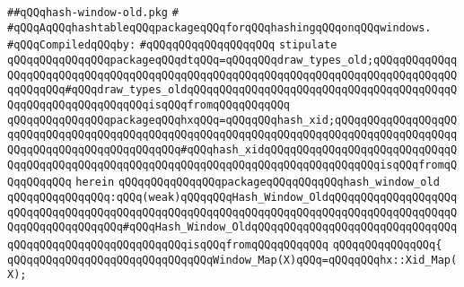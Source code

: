 \label{src/lib/x-kit/xclient/src/window/hash-window-old.pkg}
\verb|##qQQqhash-window-old.pkg|\newline
\verb|#|\newline
\verb|#qQQqAqQQqhashtableqQQqpackageqQQqforqQQqhashingqQQqonqQQqwindows.|\newline
\newline
\verb|#qQQqCompiledqQQqby:|\newline
\verb|#qQQqqQQqqQQqqQQqqQQq|\newline
\newline
\newline
\newline
\verb|stipulate|\newline
\verb|qQQqqQQqqQQqqQQqpackageqQQqdtqQQq=qQQqqQQqdraw_types_old;qQQqqQQqqQQqqQQqqQQqqQQqqQQqqQQqqQQqqQQqqQQqqQQqqQQqqQQqqQQqqQQqqQQqqQQqqQQqqQQqqQQqqQQqqQQq#qQQqdraw_types_oldqQQqqQQqqQQqqQQqqQQqqQQqqQQqqQQqqQQqqQQqqQQqqQQqqQQqqQQqqQQqqQQqisqQQqfromqQQqqQQqqQQq|\newline
\verb|qQQqqQQqqQQqqQQqpackageqQQqhxqQQq=qQQqqQQqhash_xid;qQQqqQQqqQQqqQQqqQQqqQQqqQQqqQQqqQQqqQQqqQQqqQQqqQQqqQQqqQQqqQQqqQQqqQQqqQQqqQQqqQQqqQQqqQQqqQQqqQQqqQQqqQQqqQQqqQQq#qQQqhash_xidqQQqqQQqqQQqqQQqqQQqqQQqqQQqqQQqqQQqqQQqqQQqqQQqqQQqqQQqqQQqqQQqqQQqqQQqqQQqqQQqqQQqqQQqisqQQqfromqQQqqQQqqQQq|\newline
\verb|herein|\newline
\newline
\newline
\verb|qQQqqQQqqQQqqQQqpackageqQQqqQQqqQQqhash_window_old|\newline
\verb|qQQqqQQqqQQqqQQq:qQQq(weak)qQQqqQQqHash_Window_OldqQQqqQQqqQQqqQQqqQQqqQQqqQQqqQQqqQQqqQQqqQQqqQQqqQQqqQQqqQQqqQQqqQQqqQQqqQQqqQQqqQQqqQQqqQQqqQQqqQQqqQQqqQQq#qQQqHash_Window_OldqQQqqQQqqQQqqQQqqQQqqQQqqQQqqQQqqQQqqQQqqQQqqQQqqQQqqQQqqQQqisqQQqfromqQQqqQQqqQQq|\newline
\verb|qQQqqQQqqQQqqQQq{|\newline
\verb|qQQqqQQqqQQqqQQqqQQqqQQqqQQqqQQqWindow_Map(X)qQQq=qQQqqQQqhx::Xid_Map(X);|\newline
